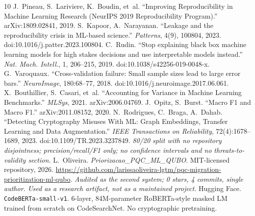 \documentclass[conference]{IEEEtran}
\newcommand{\code}[1]{\texttt{\small #1}}
\begin{document}
\begin{thebibliography}{10}
 J.~Pineau, S.~Lariviere, K.~Boudin, et~al. ``Improving Reproducibility in
Machine Learning Research (NeurIPS 2019 Reproducibility Program).''
arXiv:1809.02841, 2019.
 S.~Kapoor, A.~Narayanan. ``Leakage and the reproducibility crisis in
ML-based science.'' \emph{Patterns}, 4(9), 100804, 2023. doi:10.1016/j.patter.2023.100804.
 C.~Rudin. ``Stop explaining black box machine learning models for high
stakes decisions and use interpretable models instead.'' \emph{Nat. Mach. Intell.}, 1,
206--215, 2019. doi:10.1038/s42256-019-0048-x.
 G.~Varoquaux. ``Cross-validation failure: Small sample sizes lead to
large error bars.'' \emph{NeuroImage}, 180:68--77, 2018.
doi:10.1016/j.neuroimage.2017.06.061.
 X.~Bouthillier, S.~Casari, et~al. ``Accounting for Variance in
Machine Learning Benchmarks.'' \emph{MLSys}, 2021. arXiv:2006.04769.
 J.~Opitz, S.~Burst. ``Macro F1 and Macro F1.'' arXiv:2011.08152, 2020.
 N.~Rodrigues, C.~Braga, A.~Dahab. ``Detecting Cryptography
Misuses With ML: Graph Embeddings, Transfer Learning and Data Augmentation.''
\emph{IEEE Transactions on Reliability}, 72(4):1678--1689, 2023.
doi:10.1109/TR.2023.3237849. \textit{80/20 split with no repository disjointness;
precision/recall/F1 only; no confidence intervals and no threats-to-validity section.}
 L.~Oliveira. \emph{Priorizacao\_PQC\_ML\_QUBO}.
MIT-licensed repository, 2026. \url{https://github.com/larissaoliveira-lgtm/pqc-migration-prioritization-ml-qubo}.
\textit{Audited as the second system; 0 stars, 4 commits, single author. Used as a
research artifact, not as a maintained project.}
 Hugging Face. \code{CodeBERTa-small-v1}. 6-layer, 84M-parameter
RoBERTa-style masked LM trained from scratch on CodeSearchNet. No cryptographic pretraining.
\end{thebibliography}
\end{document}
